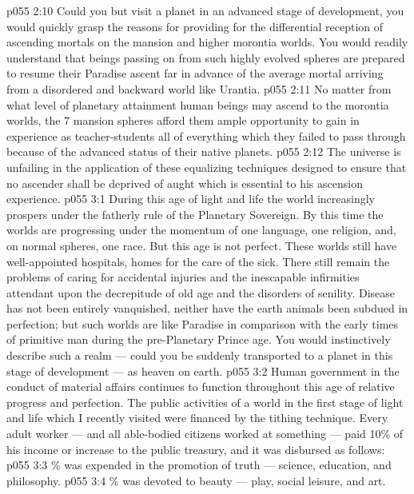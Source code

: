 \vs p055 2:10 Could you but visit a planet in an advanced stage of development, you would quickly grasp the reasons for providing for the differential reception of ascending mortals on the mansion and higher morontia worlds. You would readily understand that beings passing on from such highly evolved spheres are prepared to resume their Paradise ascent far in advance of the average mortal arriving from a disordered and backward world like Urantia.
\vs p055 2:11 No matter from what level of planetary attainment human beings may ascend to the morontia worlds, the 7 mansion spheres afford them ample opportunity to gain in experience as teacher\hyp{}students all of everything which they failed to pass through because of the advanced status of their native planets.
\vs p055 2:12 The universe is unfailing in the application of these equalizing techniques designed to ensure that no ascender shall be deprived of aught which is essential to his ascension experience.
\vs p055 3:1 During this age of light and life the world increasingly prospers under the fatherly rule of the Planetary Sovereign. By this time the worlds are progressing under the momentum of one language, one religion, and, on normal spheres, one race. But this age is not perfect. These worlds still have well\hyp{}appointed hospitals, homes for the care of the sick. There still remain the problems of caring for accidental injuries and the inescapable infirmities attendant upon the decrepitude of old age and the disorders of senility. Disease has not been entirely vanquished, neither have the earth animals been subdued in perfection; but such worlds are like Paradise in comparison with the early times of primitive man during the pre\hyp{}Planetary Prince age. You would instinctively describe such a realm --- could you be suddenly transported to a planet in this stage of development --- as heaven on earth.
\vs p055 3:2 \pc Human government in the conduct of material affairs continues to function throughout this age of relative progress and perfection. The public activities of a world in the first stage of light and life which I recently visited were financed by the tithing technique. Every adult worker --- and all able\hyp{}bodied citizens worked at something --- paid 10\% of his income or increase to the public treasury, and it was disbursed as follows:
\vs p055 3:3 \% was expended in the promotion of truth --- science, education, and philosophy.
\vs p055 3:4 \% was devoted to beauty --- play, social leisure, and art.
